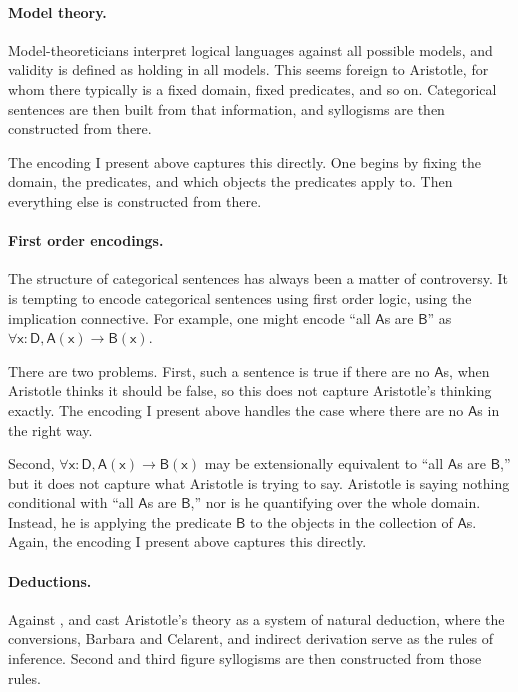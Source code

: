 \documentclass{article}
\newcommand\e{\mathsf}
\def\Arrow/{\e{\rightarrow}}
\def\x/{\e{x}}
\def\A/{\e{A}}
\def\B/{\e{B}}
\def\D/{\e{D}}
\newcommand\Dep[2]{\e{#1(#2)}}
\begin{document}
\paragraph{Model theory.}

Model-theoreticians interpret logical languages against all possible models, and validity is defined as holding in all models. This seems foreign to Aristotle, for whom there typically is a fixed domain, fixed predicates, and so on. Categorical sentences are then built from that information, and syllogisms are then constructed from there.

The encoding I present above captures this directly. One begins by fixing the domain, the predicates, and which objects the predicates apply to. Then everything else is constructed from there. 


\paragraph{First order encodings.}

The structure of categorical sentences has always been a matter of controversy.  It is tempting to encode categorical sentences using first order logic, using the implication connective. For example, one might encode ``all $\A/$s are $\B/$'' as $\forall \x/ : \D/, \Dep{A}{x} \Arrow/ \Dep{B}{x}$. 

There are two problems. First, such a sentence is true if there are no $\A/$s, when Aristotle thinks it should be false, so this does not capture Aristotle's thinking exactly. The encoding I present above handles the case where there are no $\A/$s in the right way.

Second, $\forall \x/ : \D/, \Dep{A}{x} \Arrow/ \Dep{B}{x}$ may be extensionally equivalent to ``all $\A/$s are $\B/$,'' but it does not capture what Aristotle is trying to say. Aristotle is saying nothing conditional with ``all $\A/$s are $\B/$,'' nor is he quantifying over the whole domain. Instead, he is applying the predicate $\B/$ to the objects in the collection of $\A/$s. Again, the encoding I present above captures this directly.


\paragraph{Deductions.}

Against \citet{Lukasiewicz1957}, \citet{Corcoran1974} and \citet{Smiley1973} cast Aristotle's theory as a system of natural deduction, where the conversions, Barbara and Celarent, and indirect derivation serve as the rules of inference. Second and third figure syllogisms are then constructed from those rules. 
\end{document}

